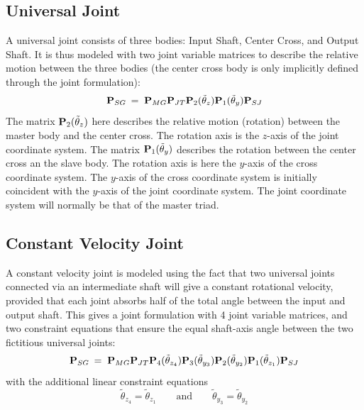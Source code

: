 \subsection{Universal Joint}

A universal joint consists of three bodies:
Input Shaft, Center Cross, and Output Shaft.
It is thus modeled with two joint variable matrices to describe the relative
motion between the three bodies (the center cross body is only implicitly
defined through the joint formulation):
%
\begin{equation}
{\bf P}_{SG} \:=\; {\bf P}_{MG}{\bf P}_{JT}
{\bf P}_2(\tilde\theta_z)
{\bf P}_1(\tilde\theta_y)
{\bf P}_{SJ}
\label{eq:UniversalJointDef}
\end{equation}
%
The matrix ${\bf P}_2(\tilde\theta_z)$ here describes the relative motion
(rotation) between the master body and the center cross.
The rotation axis is the $z$-axis of the joint coordinate system.
The matrix ${\bf P}_1(\tilde\theta_y)$ describes the rotation between the
center cross an the slave body.
The rotation axis is here the $y$-axis of the cross coordinate system.
The $y$-axis of the cross coordinate system is initially coincident with
the $y$-axis of the joint coordinate system.
The joint coordinate system will normally be that of the master triad.


\subsection{Constant Velocity Joint}

A constant velocity joint is modeled using the fact that two universal joints
connected via an intermediate shaft will give a constant rotational velocity,
provided that each joint absorbs half of the total angle between the input and
output shaft.
This gives a joint formulation with 4 joint variable matrices,
and two constraint equations that ensure the equal shaft-axis angle between the
two fictitious universal joints:
%
\begin{equation}
{\bf P}_{SG} \:=\; {\bf P}_{MG}{\bf P}_{JT}
{\bf P}_4(\tilde{\theta}_{z_4})
{\bf P}_3(\tilde{\theta}_{y_3})
{\bf P}_2(\tilde{\theta}_{y_2})
{\bf P}_1(\tilde{\theta}_{z_1})
{\bf P}_{SJ}
\label{eq:CVJointDef}
\end{equation}
%
with the additional linear constraint equations
%
\begin{equation}
\tilde{\theta}_{z_4} = \tilde{\theta}_{z_1} \qquad\mbox{and}\qquad
\tilde{\theta}_{y_3} = \tilde{\theta}_{y_2}
\label{eq:CVJointHP}
\end{equation}


